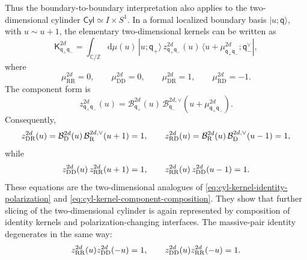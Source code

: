\documentclass[11pt,a4paper]{article}
\numberwithin{equation}{section}
\theoremstyle{plain}
\theoremstyle{definition}
\theoremstyle{remark}
\newcommand{\cyl}{\mathsf{Cyl}}
\begin{document}
Thus the boundary-to-boundary interpretation also applies to the two-dimensional cylinder \(\cyl\simeq I\times S^1\).  In a formal localized boundary basis \(|u;\mathsf q\rangle\), with \(u\sim u+1\), the elementary two-dimensional kernels can be written as
\begin{equation}
\mathsf K_{\mathsf q_+\mathsf q_-}^{2d}
=
\int_{\mathbb C/\mathbb Z}\mathrm d\mu(u)\,
|u;\mathsf q_+\rangle\,
z_{\mathsf q_+\mathsf q_-}^{2d}(u)\,
\langle u+\mu_{\mathsf q_+\mathsf q_-}^{2d};\mathsf q_-^{\vee}|,
\label{eq:2d-cylinder-kernel-operator}
\end{equation}
where
\begin{equation}
\mu_{\mathrm{RR}}^{2d}=0,
\qquad
\mu_{\mathrm{DD}}^{2d}=0,
\qquad
\mu_{\mathrm{DR}}^{2d}=1,
\qquad
\mu_{\mathrm{RD}}^{2d}=-1.
\label{eq:2d-cylinder-kernel-shifts}
\end{equation}
The component form is
\begin{equation}
z_{\mathsf q_+\mathsf q_-}^{2d}(u)
=
\mathcal B_{\mathsf q_+}^{2d}(u)\,
\mathcal B_{\mathsf q_-}^{2d,\vee}\!\left(u+\mu_{\mathsf q_+\mathsf q_-}^{2d}\right).
\label{eq:2d-cylinder-kernel-components}
\end{equation}
Consequently,
\begin{equation}
z_{\rm DR}^{2d}(u)
=
\mathcal B_{\mathrm D}^{2d}(u)\,
\mathcal B_{\mathrm R}^{2d,\vee}(u+1)=1,
\qquad
z_{\rm RD}^{2d}(u)
=
\mathcal B_{\mathrm R}^{2d}(u)\,
\mathcal B_{\mathrm D}^{2d,\vee}(u-1)=1,
\label{eq:2d-mixed-kernels-identity}
\end{equation}
while
\begin{equation}
z_{\rm DD}^{2d}(u)\,z_{\rm RR}^{2d}(u+1)=1,
\qquad
z_{\rm RR}^{2d}(u)\,z_{\rm DD}^{2d}(u-1)=1.
\label{eq:2d-kernel-component-composition}
\end{equation}
These equations are the two-dimensional analogues of \eqref{eq:cyl-kernel-identity-polarization} and \eqref{eq:cyl-kernel-component-composition}.  They show that further slicing of the two-dimensional cylinder is again represented by composition of identity kernels and polarization-changing interfaces.  The massive-pair identity degenerates in the same way:
\begin{equation}
z_{\rm RR}^{2d}(u)z_{\rm DD}^{2d}(-u)=1,
\qquad
z_{\rm DD}^{2d}(u)z_{\rm RR}^{2d}(-u)=1.
\label{eq:2d-massive-pair-identity}
\end{equation}
\end{document}
